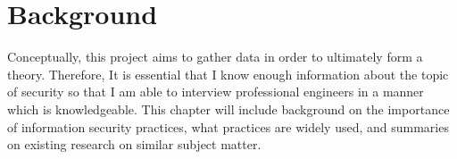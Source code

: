 \chapter{Background}\label{C:Background}

\par Conceptually, this project aims to gather data in order to ultimately form a theory. Therefore, It is essential that I know enough information about the topic of security so that I am able to interview professional engineers in a manner which is knowledgeable. This chapter will include background on the importance of information security practices, what practices are widely used, and summaries on existing research on similar subject matter. 